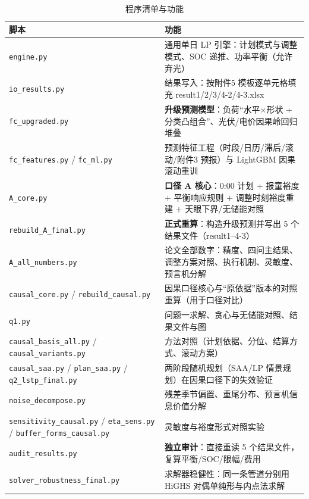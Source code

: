 \begin{table}[htbp]
\centering
\caption{程序清单与功能}
\label{tab:code}
\begin{tabularx}{\textwidth}{@{}p{4.6cm}X@{}}
\toprule
脚本 & 功能 \\
\midrule
\texttt{engine.py} & 通用单日 LP 引擎\nobreak：计划模式与调整模式\nobreak、SOC 递推\nobreak、功率平衡（允许弃光\nobreak） \\
\texttt{io\_results.py} & 结果写入\nobreak：按附件5 模板逐单元格填充 result1/2/3/4-2/4-3.xlsx \\
\texttt{fc\_upgraded.py} & \textbf{升级预测模型}\nobreak：负荷“水平$\times$形状 + 分类凸组合\nobreak”\nobreak、光伏/电价因果岭回归堆叠 \\
\texttt{fc\_features.py} / \texttt{fc\_ml.py} & 预测特征工程（时段/日历/滞后/滚动/附件3 预报\nobreak）与 LightGBM 因果滚动重训 \\
\texttt{A\_core.py} & \textbf{口径 A 核心}\nobreak：0:00 计划 $+$ 报童裕度 $+$ 平衡响应规则 $+$ 调整时刻裕度重建 $+$ 天眼下界/无储能对照 \\
\texttt{rebuild\_A\_final.py} & \textbf{正式重算}\nobreak：构造升级预测并写出 5 个结果文件（result1--4-3\nobreak） \\
\texttt{A\_all\_numbers.py} & 论文全部数字\nobreak：精度\nobreak、四问主结果\nobreak、调整方案对照\nobreak、执行机制\nobreak、灵敏度\nobreak、预言机分解 \\
\texttt{causal\_core.py} / \texttt{rebuild\_causal.py} & 因果口径核心与“原依据\nobreak”版本的对照重算（用于口径对比\nobreak） \\
\texttt{q1.py} & 问题一求解\nobreak、贪心与无储能对照\nobreak、结果文件与图 \\
\texttt{causal\_basis\_all.py} / \texttt{causal\_variants.py} & 方法对照（计划依据\nobreak、分位\nobreak、结算方式\nobreak、滚动方案\nobreak） \\
\texttt{causal\_saa.py} / \texttt{plan\_saa.py} / \texttt{q2\_lstp\_final.py} & 两阶段随机规划（SAA/LP 情景规划\nobreak）在因果口径下的失效验证 \\
\texttt{noise\_decompose.py} & 残差季节偏置\nobreak、重尾分布\nobreak、预言机信息价值分解 \\
\texttt{sensitivity\_causal.py} / \texttt{eta\_sens.py} / \texttt{buffer\_forms\_causal.py} & 灵敏度与裕度形式对照实验 \\
\texttt{audit\_results.py} & \textbf{独立审计}\nobreak：直接重读 5 个结果文件\nobreak，复算平衡/SOC/限幅/费用 \\
\texttt{solver\_robustness\_\allowbreak final.py} & 求解器稳健性\nobreak：同一条管道分别用 HiGHS 对偶单纯形与内点法求解 \\

\end{tabularx}
\end{table}
